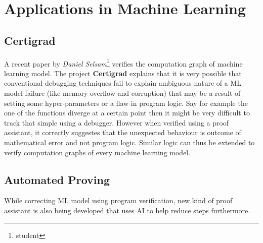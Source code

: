 \chapter{Applications in Machine Learning }

\section{Certigrad}
A recent paper by \textit{Daniel Selsam}\footnote{student} verifies the computation graph of machine learning model. The project \textbf{Certigrad} explains that it is very possible that conventional debugging techniques fail to explain ambiguous nature of a ML model failure (like memory overflow and corruption) that may be a result of setting some hyper-parameters or a flaw in program logic. Say for example the one of the functions diverge at a certain point then it might be very difficult to track that simple using a debugger. However when verified using a proof assistant, it correctly suggestes that the unexpected behaviour is outcome of mathematical error and not program logic. Similar logic can thus be extended to verify computation graphs of every machine learning model. 

\section{Automated Proving}
While correcting ML model using program verification, new kind of proof assistant is also being developed that uses AI to help reduce steps furthermore.
